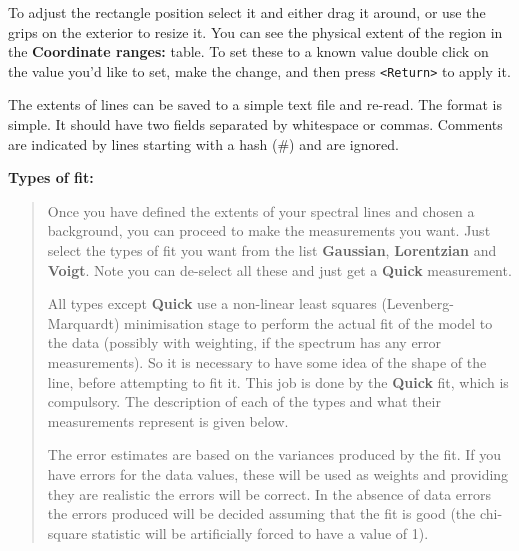 \documentclass[twoside,11pt]{article}
\renewcommand{\_}{\texttt{\symbol{95}}}
\newcommand{\labelitem}[1]{\textbf{#1}}
\newcommand{\hitext}[1]{\texttt{#1}}
\newcommand{\subheading}[1]{\textbf{\large{#1}}}
\begin{document}
To adjust the rectangle position select it and either drag it around,
or use the grips on the exterior to resize it. You can see the
physical extent of the region in the \labelitem{Coordinate ranges:}
table. To set these to a known value double click on the value you'd
like to set, make the change, and then press \hitext{<Return>} to
apply it.

The extents of lines can be saved to a simple text file and
re-read. The format is simple. It should have two fields separated by
whitespace or commas. Comments are indicated by lines starting with a
hash (\#) and are ignored.

\subheading{Types of fit:}
\begin{quote}
 Once you have defined the extents of your spectral lines and chosen a
 background, you can proceed to make the measurements you want. Just
 select the types of fit you want from the list \labelitem{Gaussian},
 \labelitem{Lorentzian} and \labelitem{Voigt}. Note you can de-select
 all these and just get a \labelitem{Quick} measurement.

 All types except \labelitem{Quick} use a non-linear least squares
 (Levenberg-Marquardt) minimisation stage to perform the actual fit of
 the model to the data (possibly with weighting, if the spectrum has
 any error measurements). So it is necessary to have some idea of the
 shape of the line, before attempting to fit it. This job is done by
 the \labelitem{Quick} fit, which is compulsory. The description of
 each of the types and what their measurements represent is given
 below.

 The error estimates are based on the variances produced by the fit.
 If you have errors for the data values, these will be used as weights
 and providing they are realistic the errors will be correct. In the
 absence of data errors the errors produced will be decided assuming
 that the fit is good (the chi-square statistic will be artificially
 forced to have a value of 1).


\end{quote}
\end{document}
